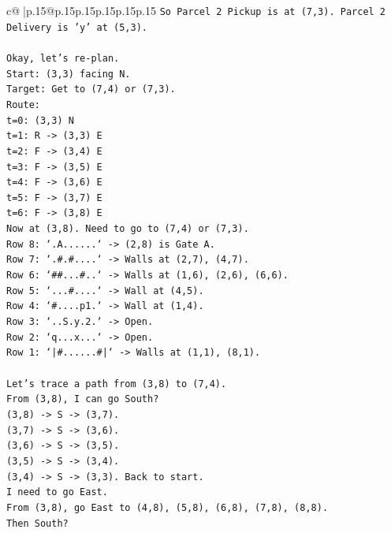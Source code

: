 \documentclass{article}
\begin{document}
{\begin{supertabular}{c@{$\;$}|p{.15\linewidth}@{}p{.15\linewidth}p{.15\linewidth}p{.15\linewidth}p{.15\linewidth}p{.15\linewidth}}
{{{\texttt{So Parcel 2 Pickup is at (7,3). Parcel 2 Delivery is 'y' at (5,3).} \\
\\ 
\texttt{Okay, let's re{-}plan.} \\
\texttt{Start: (3,3) facing N.} \\
\texttt{Target: Get to (7,4) or (7,3).} \\
\texttt{Route:} \\
\texttt{t=0: (3,3) N} \\
\texttt{t=1: R {-}> (3,3) E} \\
\texttt{t=2: F {-}> (3,4) E} \\
\texttt{t=3: F {-}> (3,5) E} \\
\texttt{t=4: F {-}> (3,6) E} \\
\texttt{t=5: F {-}> (3,7) E} \\
\texttt{t=6: F {-}> (3,8) E} \\
\texttt{Now at (3,8). Need to go to (7,4) or (7,3).} \\
\texttt{Row 8: `.A......` {-}> (2,8) is Gate A.} \\
\texttt{Row 7: `.\#.\#....` {-}> Walls at (2,7), (4,7).} \\
\texttt{Row 6: `\#\#...\#..` {-}> Walls at (1,6), (2,6), (6,6).} \\
\texttt{Row 5: `...\#....` {-}> Wall at (4,5).} \\
\texttt{Row 4: `\#....p1.` {-}> Wall at (1,4).} \\
\texttt{Row 3: `..S.y.2.` {-}> Open.} \\
\texttt{Row 2: `q...x...` {-}> Open.} \\
\texttt{Row 1: `|\#......\#|` {-}> Walls at (1,1), (8,1).} \\
\\ 
\texttt{Let's trace a path from (3,8) to (7,4).} \\
\texttt{From (3,8), I can go South?} \\
\texttt{(3,8) {-}> S {-}> (3,7).} \\
\texttt{(3,7) {-}> S {-}> (3,6).} \\
\texttt{(3,6) {-}> S {-}> (3,5).} \\
\texttt{(3,5) {-}> S {-}> (3,4).} \\
\texttt{(3,4) {-}> S {-}> (3,3). Back to start.} \\
\texttt{I need to go East.} \\
\texttt{From (3,8), go East to (4,8), (5,8), (6,8), (7,8), (8,8).} \\
\texttt{Then South?} \\
}}}
\end{supertabular}}
\end{document}
